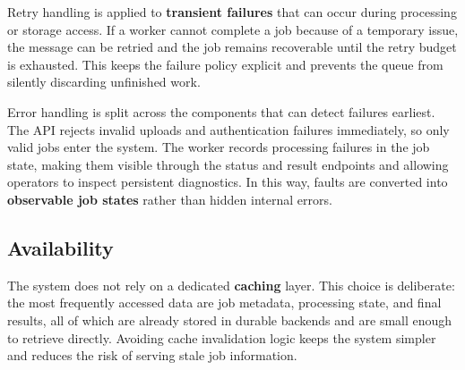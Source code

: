\documentclass{scrartcl}
\begin{document}
Retry handling is applied to \textbf{transient failures} that can occur during processing or storage access.
If a worker cannot complete a job because of a temporary issue, the message can be retried and the job remains recoverable until the retry budget is exhausted.
This keeps the failure policy explicit and prevents the queue from silently discarding unfinished work.

Error handling is split across the components that can detect failures earliest.
The API rejects invalid uploads and authentication failures immediately, so only valid jobs enter the system.
The worker records processing failures in the job state, making them visible through the status and result endpoints and allowing operators to inspect persistent diagnostics.
In this way, faults are converted into \textbf{observable job states} rather than hidden internal errors.

\subsection{Availability}\label{availability}

  


The system does not rely on a dedicated \textbf{caching} layer.
This choice is deliberate: the most frequently accessed data are job metadata, processing state, and final results, all of which are already stored in durable backends and are small enough to retrieve directly.
Avoiding cache invalidation logic keeps the system simpler and reduces the risk of serving stale job information.
\end{document}
